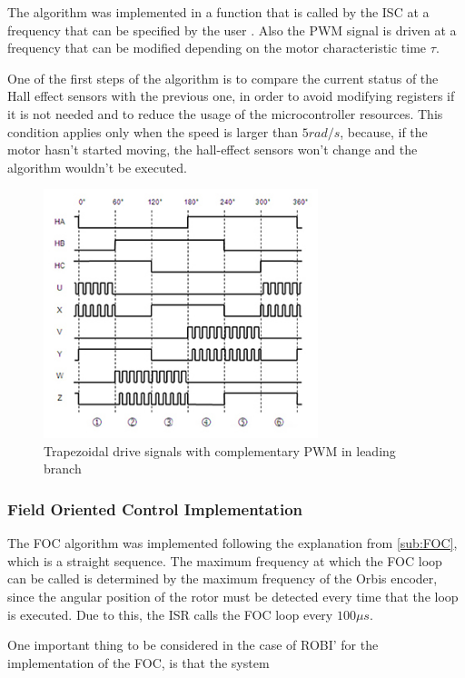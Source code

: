 The algorithm was implemented in a function that is called by the \ac{ISC} at a frequency that can be specified by the user . Also the \ac{PWM} signal is driven at a frequency that can be modified depending on the motor characteristic time $\tau$. 

One of the first steps of the algorithm is to compare the current status of the Hall effect sensors with the previous one, in order to avoid modifying registers if it is not needed and to reduce the usage of the microcontroller resources. This condition applies only when the speed is larger than $5 rad/s$, because, if the motor hasn't started moving, the hall-effect sensors won't change and the algorithm wouldn't be executed.

\begin{figure}[htbp]
\centering
\includegraphics[width=8cm]{Images/trap_comp.png} 
\caption[Trapezoidal drive with complementary PWM]{Trapezoidal drive signals with complementary PWM in leading branch}
\label{fig:trap_comp}
\end{figure}

\subsubsection{Field Oriented Control Implementation}

The \ac{FOC} algorithm was implemented following the explanation from \ref{sub:FOC}, which is a straight sequence. The maximum frequency at which the \ac{FOC} loop can be called is determined by the maximum frequency of the Orbis encoder, since the angular position of the rotor must be detected every time that the loop is executed. Due to this, the \ac{ISR} calls the \ac{FOC} loop every $100\mu s$.

One important thing to be considered in the case of ROBI' for the implementation of the \ac{FOC}, is that the system 

